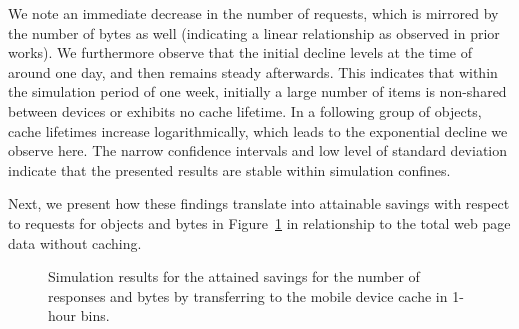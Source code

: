 \documentclass[letterpaper,journal,onecolumn,draftcls]{IEEEtran}
\begin{document}
We note an immediate decrease in the number of requests, which is mirrored by the number of bytes as well (indicating a linear relationship as observed in prior works).
We furthermore observe that the initial decline levels at the time of around one day, and then remains steady afterwards.
This indicates that within the simulation period of one week, initially a large number of items is non-shared between devices or exhibits no cache lifetime. 
In a following group of objects, cache lifetimes increase logarithmically, which leads to the exponential decline we observe here.
The narrow confidence intervals and low level of standard deviation indicate that the presented results are stable within simulation confines.
%

Next, we present how these findings translate into attainable savings with respect to requests for objects and bytes in Figure~\ref{fig:sim2} in relationship to the total web page data without caching.
\begin{figure}[]
	\centering
	\qquad
	\caption{Simulation results for the attained savings for the number of responses and bytes by transferring to the mobile device cache in 1-hour bins.}
	\label{fig:sim2}
\end{figure}
\end{document}
